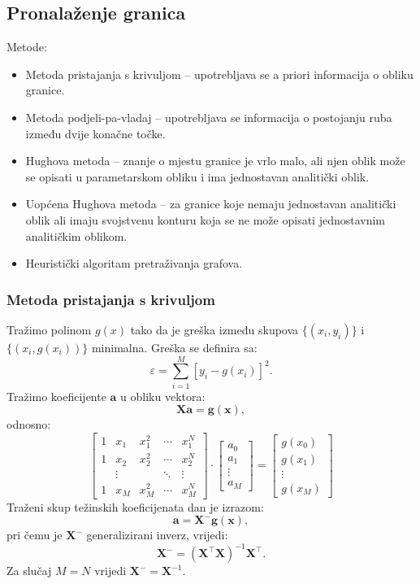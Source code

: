 \documentclass[11pt,english]{article}
\begin{document}
\subsection{Pronalaženje granica}
Metode:
\begin{itemize}
  \item Metoda pristajanja s krivuljom -- upotrebljava se a priori informacija o obliku granice.
  \item Metoda podjeli-pa-vladaj -- upotrebljava se informacija o postojanju ruba između dvije konačne točke.
  \item Hughova metoda -- znanje o mjestu granice je vrlo malo, ali njen oblik može se opisati u parametarskom obliku i ima jednostavan analitički oblik.
  \item Uopćena Hughova metoda -- za granice koje nemaju jednostavan analitički oblik ali imaju svojstvenu konturu koja se ne može opisati jednostavnim analitičkim oblikom.
  \item Heuristički algoritam pretraživanja grafova.
\end{itemize}

\subsubsection{Metoda pristajanja s krivuljom}
Tražimo polinom $g(x)$ tako da je greška između skupova $\{(x_i,y_i)\}$ i $\{(x_i,g(x_i))\}$ minimalna. Greška se definira sa:
$$\varepsilon = \sum_{i=1}^M\left [ y_i - g(x_i) \right ]^2.$$
Tražimo koeficijente $\mathbf a$ u obliku vektora:
$$\mathbf X \mathbf a = \mathbf g(\mathbf x),$$
odnosno:
$$\begin{bmatrix}
1 & x_1 & x_1^2 & \cdots & x_1^N\\
1 & x_2 & x_2^2 & \cdots & x_2^N\\
& \vdots & & \ddots & \vdots\\
1 & x_M & x_M^2 & \cdots & x_M^N
\end{bmatrix}
\cdot
\begin{bmatrix}
a_0\\
a_1\\
\vdots\\
a_M
\end{bmatrix}
=
\begin{bmatrix}
g(x_0)\\
g(x_1)\\
\vdots\\
g(x_M)
\end{bmatrix}$$
Traženi skup težinskih koeficijenata dan je izrazom:
$$\mathbf a = \mathbf X^- \mathbf g(\mathbf x),$$
pri čemu je $\mathbf X^-$ generalizirani inverz, vrijedi:
$$\mathbf X^- = \left ( \mathbf X^\top\mathbf X\right )^{-1}\mathbf X^\top.$$
Za slučaj $M = N$ vrijedi $\mathbf X^- = \mathbf X^{-1}$.
\end{document}
